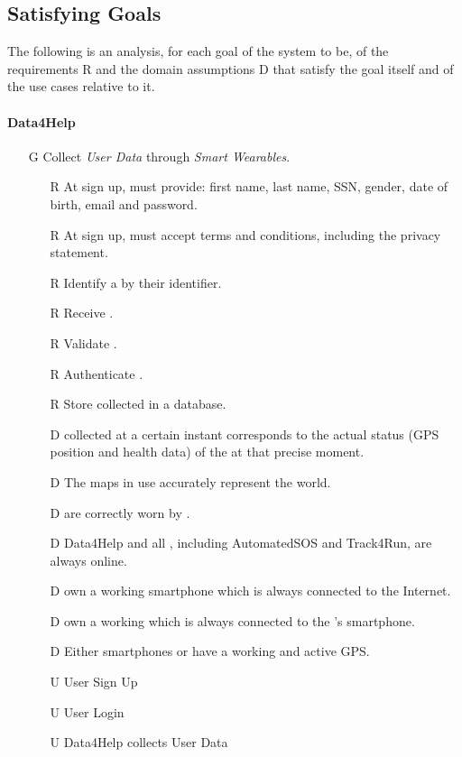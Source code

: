\documentclass[../../../rasd.tex]{subfiles}
\begin{document}
\subsection{Satisfying Goals}
The following is an analysis, for each goal of the system to be, of the requirements R and the domain assumptions D that satisfy the goal itself and of the use cases relative to it.
\paragraph{Data4Help}
\begin{itemize}

    \item[G\subs{1}]Collect \textit{User Data} through \textit{Smart Wearables}.
    \begin{itemize}
        \item[R\subs{2}]At sign up,  must provide: first name, last name, SSN, gender, date of birth, email and password.
        \item[R\subs{4}]At sign up,  must accept terms and conditions, including the privacy statement.
        \item[R\subs{6}]Identify a  by their identifier.
        \item[R\subs{8}]Receive .
        \item[R\subs{9}]Validate .
        \item[R\subs{10}]Authenticate .
        \item[R\subs{11}]Store collected  in a database.
        \\
        \item[D\subs{2}] collected at a certain instant corresponds to the actual status (GPS position and health data) of the  at that precise moment.              
        \item[D\subs{3}]The maps in use accurately represent the world.
        \item[D\subs{8}] are correctly worn by .
        \item[D\subs{9}]Data4Help and all , including AutomatedSOS and Track4Run, are always online.
        \item[D\subs{10}] own a working smartphone which is always connected to the Internet.
        \item[D\subs{11}] own a working  which is always connected to the 's smartphone.
        \item[D\subs{12}]Either smartphones or  have a working and active GPS.
        \\
        \item[U\subs{1}]User Sign Up
        \item[U\subs{3}]User Login
        \item[U\subs{5}]Data4Help collects User Data


\end{itemize}
\end{itemize}
\end{document}
